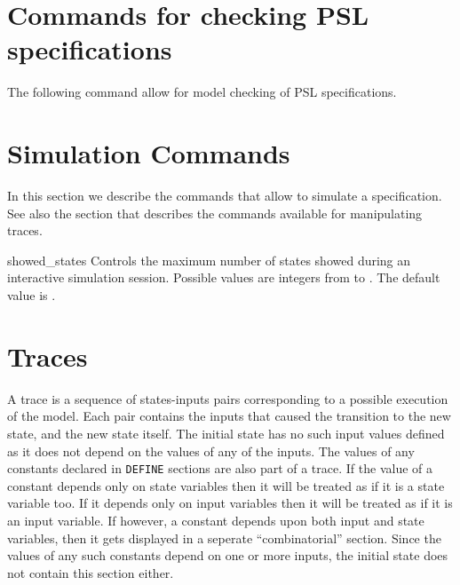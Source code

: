 

\section{Commands for checking PSL specifications}
\label{Commands for checking PSL specifications}

The following command allow for model checking of PSL specifications.




\section{Simulation Commands}
\label{Simulation Commands}

In this section we describe the commands that allow to simulate a
\nusmv specification. See also the section  that
describes the commands available for manipulating traces.



\begin{nusmvVar} {showed\_states}{}{}
Controls the maximum number of states showed during an interactive
simulation session. Possible values are integers from
 to . The default value is .
\end{nusmvVar}



\section{Traces}
\label{Traces}
%
A trace is a sequence of states-inputs pairs corresponding to a
possible execution of the model. Each pair contains the inputs that
caused the transition to the new state, and the new state itself. The
initial state has no such input values defined as it does not depend
on the values of any of the inputs. The values of any constants
declared in \texttt{DEFINE} sections are also part of a trace. If the
value of a constant depends only on state variables then it will be
treated as if it is a state variable too. If it depends only on input
variables then it will be treated as if it is an input variable. If
however, a constant depends upon both input and state variables, then
it gets displayed in a seperate ``combinatorial'' section. Since the
values of any such constants depend on one or more inputs, the initial
state does not contain this section either.\\

